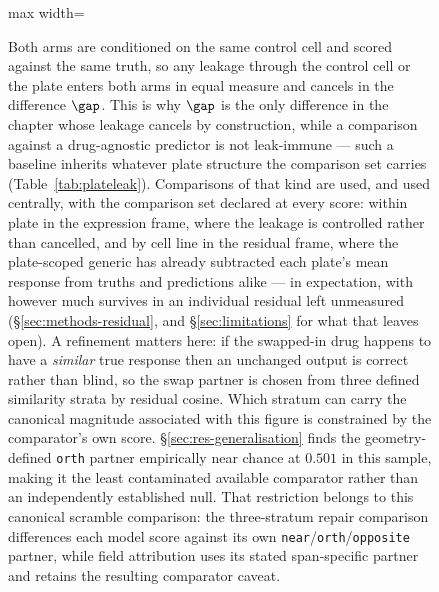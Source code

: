 \begin{figure}[htbp]
\begin{adjustbox}{max width=\linewidth}
\begin{tikzpicture}
\end{tikzpicture}
\end{adjustbox}
\caption[The scramble ablation]{ Both arms are conditioned on the same control cell and scored against the same truth,
so any leakage through the control cell or the plate enters both arms in equal measure and cancels in
the difference $\gap$. This is why $\gap$ is the only difference in the chapter whose leakage cancels
by construction, while a comparison against a drug-agnostic predictor is not leak-immune --- such a
baseline inherits whatever plate structure the comparison set carries
(Table~\ref{tab:plateleak}). Comparisons of that kind are used, and used centrally, with the
comparison set declared at every score: within plate in the expression frame, where the leakage is
controlled rather than cancelled, and by cell line in the residual frame, where the plate-scoped
generic has already subtracted each plate's mean response from truths and predictions alike --- in
expectation, with however much survives in an individual residual left unmeasured
(\S\ref{sec:methods-residual}, and \S\ref{sec:limitations} for what that leaves open).
A refinement matters here: if the swapped-in drug happens to have a
\emph{similar} true response then an unchanged output is correct rather than blind, so the swap
partner is chosen from three defined similarity strata by residual cosine. Which stratum can carry
the canonical magnitude associated with this figure is constrained by the comparator's own score.
\S\ref{sec:res-generalisation} finds the geometry-defined \texttt{orth} partner empirically near
chance at $0.501$ in this sample, making it the least contaminated available comparator rather than
an independently established null. That restriction belongs to this canonical scramble comparison:
the three-stratum repair comparison differences each model score against its own
\texttt{near}/\texttt{orth}/\texttt{opposite} partner, while field attribution uses its stated
span-specific partner and retains the resulting comparator caveat.}
\label{fig:scramble}
\end{figure}
